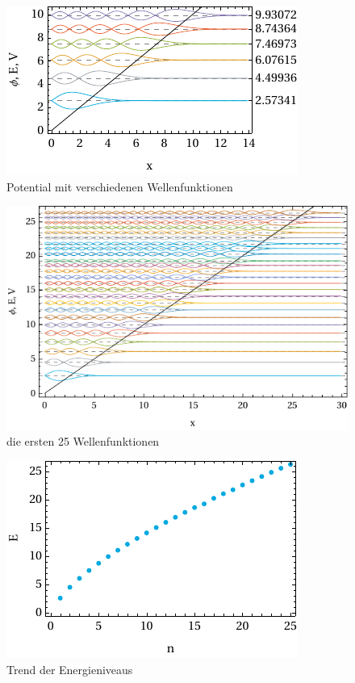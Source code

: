 \begin{figure}[h!]
	\centering
	\includegraphics[scale = 1.388888888]{img/out.pdf}
	\caption{Potential mit verschiedenen Wellenfunktionen}
	\label{fig:out}
\end{figure}


\begin{figure}[h!]
	\centering
	\includegraphics[scale = 1.388888888]{img/large.pdf}
	\caption{die ersten 25 Wellenfunktionen}
	\label{fig:large}
\end{figure}

\begin{figure}[h!]
	\centering
	\includegraphics[scale = 1.388888888]{img/trend.pdf}
	\caption{Trend der Energieniveaus}
	\label{fig:trend}
\end{figure}


